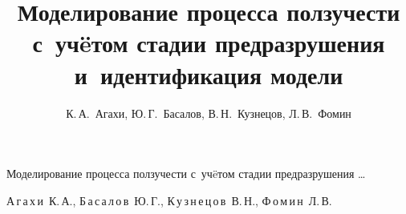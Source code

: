 


% 

%


%

%

%

% 

%

%

%





\renewcommand{\firstpage}{243}

\renewcommand{\lastpage}{247}
















\title{Моделирование процесса ползучести с~уч\"eтом стадии предразрушения и~идентификация модели}%

{Моделирование процесса ползучести с~уч\"eтом стадии предразрушения \dots}%



\author{К.\,А.~Агахи, Ю.\,Г.~Басалов, В.\,Н.~Кузнецов, Л.\,В.~Фомин}%

{А\,г\,а\,х\,и~К.\,А., Б\,а\,с\,а\,л\,о\,в~Ю.\,Г., К\,у\,з\,н\,е\,ц\,о\,в~В.\,Н., Ф\,о\,м\,и\,н~Л.\,В.}%








